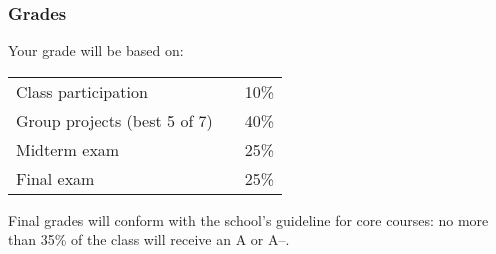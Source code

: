 \documentclass[letterpaper,12pt]{article}
\begin{document}
\subsubsection*{Grades}

Your grade will be based on:
%
\begin{center}
\begin{tabular}{lcc}
    Class participation &\hspace*{0.50in}&   10\%  \\
    Group projects (best 5 of 7) &&  40\% \\
    Midterm exam &&  25\% \\
    Final exam   &&  25\%
\end{tabular}
\end{center}
%
Final grades will conform with the school's guideline for core courses:
no more than 35\% of the class will receive an A or A--. 
\end{document}
